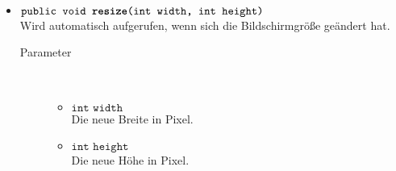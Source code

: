\begin{description}
\begin{itemize}
		\item $\texttt{public void \textbf{resize}(int width, int height)}$ \\ Wird automatisch aufgerufen, wenn sich die Bildschirmgröße geändert hat.
		\begin{description}
			\item[Parameter] \hfill \\
			\vspace{-.8cm}
			\begin{itemize}
				\item $\texttt{int width}$ \\ Die neue Breite in Pixel.
				\item $\texttt{int height}$ \\ Die neue Höhe in Pixel.
			\end{itemize}
		\end{description}
		
	\end{itemize}
\end{description}
